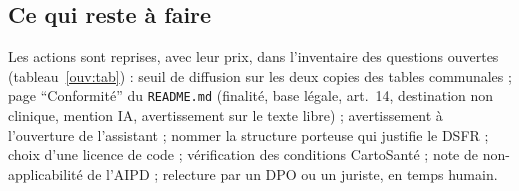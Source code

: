 \subsection{Ce qui reste à faire}\label{conf:reste}

Les actions sont reprises, avec leur prix, dans l'inventaire des questions ouvertes (tableau~\ref{ouv:tab}) :
seuil de diffusion sur les deux copies des tables communales ;
page \enquote{Conformité} du \texttt{README.md} (finalité, base légale, art.~14, destination non clinique, mention IA, avertissement sur le texte libre) ;
avertissement à l'ouverture de l'assistant ;
nommer la structure porteuse qui justifie le DSFR ;
choix d'une licence de code ;
vérification des conditions CartoSanté ;
note de non-applicabilité de l'AIPD ;
relecture par un DPO ou un juriste, en temps humain.
\endgroup
